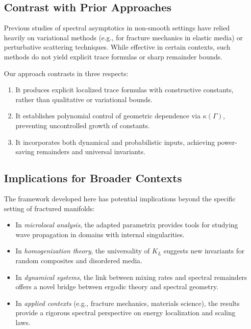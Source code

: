 \subsection*{Contrast with Prior Approaches}

Previous studies of spectral asymptotics in non-smooth settings have
relied heavily on variational methods (e.g., for fracture mechanics in
elastic media) or perturbative scattering techniques. While effective in
certain contexts, such methods do not yield explicit trace formulas or
sharp remainder bounds.

Our approach contrasts in three respects:
\begin{enumerate}
  \item It produces explicit localized trace formulas with constructive
  constants, rather than qualitative or variational bounds.
  \item It establishes polynomial control of geometric dependence via
  $\kappa(\Gamma)$, preventing uncontrolled growth of constants.
  \item It incorporates both dynamical and probabilistic inputs,
  achieving power-saving remainders and universal invariants.
\end{enumerate}

\subsection*{Implications for Broader Contexts}

The framework developed here has potential implications beyond the
specific setting of fractured manifolds:
\begin{itemize}
  \item In \emph{microlocal analysis}, the adapted parametrix provides
  tools for studying wave propagation in domains with internal
  singularities.
  \item In \emph{homogenization theory}, the universality of $K_L$
  suggests new invariants for random composites and disordered media.
  \item In \emph{dynamical systems}, the link between mixing rates and
  spectral remainders offers a novel bridge between ergodic theory and
  spectral geometry.
  \item In \emph{applied contexts} (e.g., fracture mechanics, materials
  science), the results provide a rigorous spectral perspective on
  energy localization and scaling laws.
\end{itemize}

